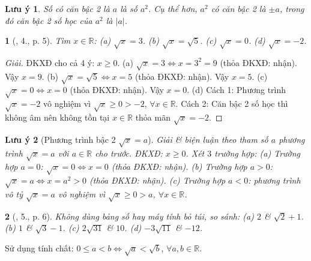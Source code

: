\documentclass{article}
\newtheorem{baitoan}{}
\newtheorem{luuy}{Lưu ý}
\begin{document}
\begin{luuy}
	Số có căn bậc 2 là $a$ là số $a^2$. Cụ thể hơn, $a^2$ có căn bậc 2 là $\pm a$, trong đó căn bậc 2 số học của $a^2$ là $|a|$.
\end{luuy}

\begin{baitoan}[\cite{SBT_Toan_9_tap_1}, 4., p. 5]
	Tìm $x\in\mathbb{R}$: (a) $\sqrt{x} = 3$. (b) $\sqrt{x} = \sqrt{5}$. (c) $\sqrt{x} = 0$. (d) $\sqrt{x} = -2$.
\end{baitoan}

\begin{proof}[Giải]
	ĐKXĐ cho cả 4 ý: $x\ge0$. (a) $\sqrt{x} = 3\Leftrightarrow x = 3^2 = 9$ (thỏa ĐKXĐ: nhận). Vậy $x = 9$. (b) $\sqrt{x} = \sqrt{5}\Leftrightarrow x = 5$ (thỏa ĐKXĐ: nhận). Vậy $x = 5$. (c) $\sqrt{x} = 0\Leftrightarrow x = 0$ (thỏa ĐKXĐ: nhận). Vậy $x = 0$. (d) {\sf Cách 1:} Phương trình $\sqrt{x} = -2$ vô nghiệm vì $\sqrt{x}\ge0 > -2$, $\forall x\in\mathbb{R}$. {\sf Cách 2:} Căn bậc 2 số học thì không âm nên không tồn tại $x\in\mathbb{R}$ thỏa mãn $\sqrt{x} = -2$.
\end{proof}

\begin{luuy}[Phương trình bậc 2 $\sqrt{x} = a$]
	Giải \& biện luận theo tham số $a$ phương trình $\sqrt{x} = a$ với $a\in\mathbb{R}$ cho trước. ĐKXĐ: $x\ge0$. Xét $3$ trường hợp: (a) Trường hợp $a = 0$: $\sqrt{x} = 0\Leftrightarrow x = 0$ (thỏa ĐKXĐ: nhận). (b) Trường hợp $a > 0$: $\sqrt{x} = a\Leftrightarrow x = a^2 > 0$ (thỏa ĐKXĐ: nhận). (c) Trường hợp $a < 0$: phương trình vô tỷ $\sqrt{x} = a$ vô nghiệm vì $\sqrt{x}\ge0 > a$, $\forall x\in\mathbb{R}$.
\end{luuy}

\begin{baitoan}[\cite{SBT_Toan_9_tap_1}, 5., p. 6]
	Không dùng bảng số hay máy tính bỏ túi, so sánh: (a) $2$ \& $\sqrt{2} + 1$. (b) $1$ \& $\sqrt{3} - 1$. (c) $2\sqrt{31}$ \& $10$. (d) $-3\sqrt{11}$ \& $-12$.
\end{baitoan}
 Sử dụng tính chất: $0\le a < b\Leftrightarrow\sqrt{a} < \sqrt{b}$, $\forall a,b\in\mathbb{R}$.
\end{document}

